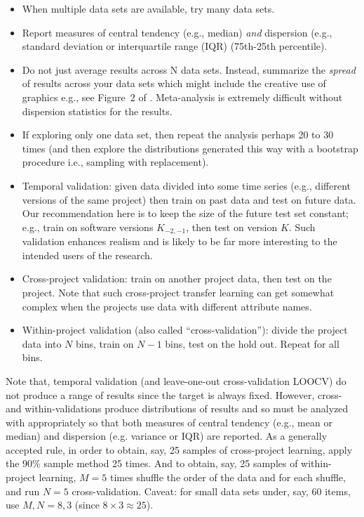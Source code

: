 \documentclass[preprint,10pt]{elsarticle}
\begin{document}
\begin{itemize}
\item When multiple data sets are available, try many data sets.
\item Report measures of central tendency (e.g., median) \textit{and} dispersion (e.g., standard deviation or interquartile range (IQR) (75th-25th percentile).
\item Do not just average results across N data sets. Instead, summarize the \textit{spread} of results across your data sets which might include the creative use of graphics e.g., see Figure~2 of \cite{fu2017}.  Meta-analysis is extremely difficult without dispersion statistics for the results.
\item If exploring only one data set, then repeat the analysis perhaps 20 to 30 times (and then explore the distributions generated this way with a bootstrap procedure i.e., sampling with replacement). %
\item Temporal validation: given data divided into some time series (e.g., different versions of the same project) then train on past data and test on future data. Our recommendation here is to keep the size of the future test set constant; e.g., train on software versions $K_{-2,-1}$, then test on version $K$.  Such validation enhances realism and is likely to be far more interesting to the intended users of the research.
\item Cross-project validation: train on another project data, then test on the project. Note that such cross-project transfer learning can get somewhat complex when the projects use data with different attribute names.
\item Within-project validation (also called ``cross-validation''): divide the project data into $N$ bins, train on $N-1$ bins, test on the hold out. Repeat for all bins.  
\end{itemize}


Note that, temporal validation (and leave-one-out cross-validation LOOCV) do not produce a range of results since the target is always fixed. However, cross- and within-validations produce distributions of results and so must be analyzed with appropriately so that both measures of central tendency (e.g., mean or median) and dispersion (e.g. variance or IQR) are reported. As a generally accepted rule, in order to obtain, say, 25 samples of cross-project learning, apply the 90\% sample method 25 times. And to obtain, say, 25 samples of within-project learning, $M=5$ times shuffle the order of the data and for each shuffle, and run $N=5$ cross-validation.  Caveat: for small data sets under, say, 60 items, use $M,N=8,3$ (since $8 \times 3 \approx 25$).
\end{document}
